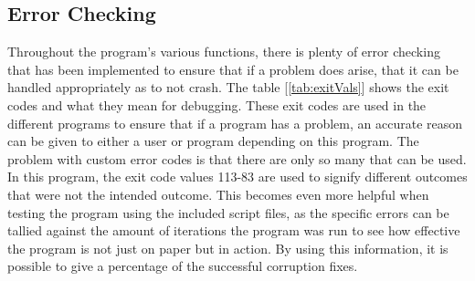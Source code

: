 \documentclass{article}
\begin{document}
\begin{multicols}{2}
    \section{Error Checking}\label{sec:exitErrs}
    Throughout the program's various functions, there is plenty of error checking that has been implemented to ensure that if a problem does arise, that it can be handled 
    appropriately as to not crash. The table [\ref{tab:exitVals}] shows the exit codes and what they mean for debugging. These exit codes are used in the different programs to ensure that if
    a program has a problem, an accurate reason can be given to either a user or program depending on this program. The problem with custom error codes is that there are only 
    so many that can be used. In this program, the exit code values 113-83 are used to signify different outcomes that were not the intended outcome. This becomes even more helpful
    when testing the program using the included script files, as the specific errors can be tallied against the amount of iterations the program was run to see how effective the
    program is not just on paper but in action. By using this information, it is possible to give a percentage of the successful corruption fixes.

    \end{multicols}
\end{document}
